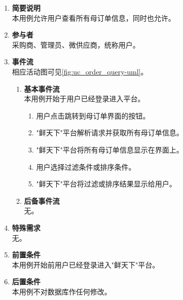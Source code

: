 \begin{enumerate}
    \item \textbf{简要说明}  \\ 本用例允许用户查看所有母订单信息，同时也允许。
    \item \textbf{参与者} \\ 采购商、管理员、微供应商，统称用户。
    \item \textbf{事件流} \\ 相应活动图可见\autoref{fig:uc_order_query-uml}。
    \begin{enumerate} 
        \item \textbf{基本事件流} \\ 本用例开始于用户已经登录进入平台。
        \begin{enumerate}
            \item 用户点击跳转到母订单界面的按钮。

            \item "鲜天下"平台解析请求并获取所有母订单信息。

            \item "鲜天下"平台将所有母订单信息显示在界面上。

            \item 用户选择过滤条件或排序条件。
            
            \item "鲜天下"平台将过滤或排序结果显示给用户。

        \end{enumerate}
        \item \textbf{后备事件流}  \\ 无。
        
    \end{enumerate}
    \item \textbf{特殊需求} \\ 无。
    \item \textbf{前置条件} \\ 本用例开始前用户已经登录进入"鲜天下"平台。
    \item \textbf{后置条件} \\ 本用例不对数据库作任何修改。
\end{enumerate}



